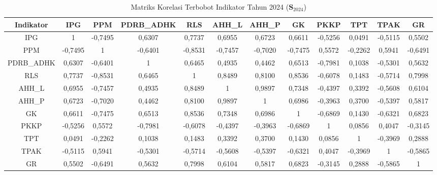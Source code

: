 \begin{table}[H]
\centering
\caption{Matriks Korelasi Terbobot Indikator Tahun 2024 ($\mathbf{S}_{2024}$)} \label{tab:app2matriks_intra_loading_2024}
\begin{adjustbox}{max width=\textwidth, max height=0.85\textheight}
\begin{tabular}{|c|c|c|c|c|c|c|c|c|c|c|c|}
\hline
\textbf{Indikator} & \textbf{IPG} & \textbf{PPM} & \textbf{PDRB\_ADHK} & \textbf{RLS} & \textbf{AHH\_L} & \textbf{AHH\_P} & \textbf{GK} & \textbf{PKKP} & \textbf{TPT} & \textbf{TPAK} & \textbf{GR} \\
\hline
IPG & 1 & -0,7495 & 0,6307 & 0,7737 & 0,6955 & 0,6723 & 0,6611 & -0,5256 & 0,0491 & -0,5115 & 0,5502 \\
PPM & -0,7495 & 1 & -0,6401 & -0,8531 & -0,7457 & -0,7020 & -0,7475 & 0,5572 & -0,2262 & 0,5941 & -0,6491 \\
PDRB\_ADHK & 0,6307 & -0,6401 & 1 & 0,6465 & 0,4935 & 0,4462 & 0,6513 & -0,7981 & 0,1038 & -0,5301 & 0,5632 \\
RLS & 0,7737 & -0,8531 & 0,6465 & 1 & 0,8489 & 0,8100 & 0,8536 & -0,6078 & 0,1483 & -0,5714 & 0,7998 \\
AHH\_L & 0,6955 & -0,7457 & 0,4935 & 0,8489 & 1 & 0,9897 & 0,7348 & -0,4397 & 0,3392 & -0,5608 & 0,6104 \\
AHH\_P & 0,6723 & -0,7020 & 0,4462 & 0,8100 & 0,9897 & 1 & 0,6986 & -0,3963 & 0,3700 & -0,5397 & 0,5817 \\
GK & 0,6611 & -0,7475 & 0,6513 & 0,8536 & 0,7348 & 0,6986 & 1 & -0,6869 & 0,1430 & -0,6321 & 0,6823 \\
PKKP & -0,5256 & 0,5572 & -0,7981 & -0,6078 & -0,4397 & -0,3963 & -0,6869 & 1 & 0,0856 & 0,4047 & -0,3145 \\
TPT & 0,0491 & -0,2262 & 0,1038 & 0,1483 & 0,3392 & 0,3700 & 0,1430 & 0,0856 & 1 & -0,3969 & 0,2888 \\
TPAK & -0,5115 & 0,5941 & -0,5301 & -0,5714 & -0,5608 & -0,5397 & -0,6321 & 0,4047 & -0,3969 & 1 & -0,5865 \\
GR & 0,5502 & -0,6491 & 0,5632 & 0,7998 & 0,6104 & 0,5817 & 0,6823 & -0,3145 & 0,2888 & -0,5865 & 1 \\
\hline
\end{tabular}
\end{adjustbox}
\end{table}
